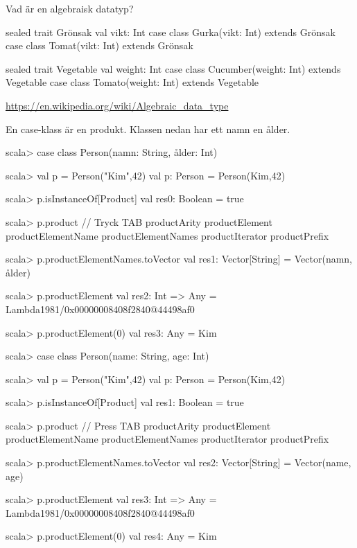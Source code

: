 \begin{Slide}{Vad är en algebraisk datatyp?}
\begin{itemize}
\begin{itemize}
\ifswedish
\begin{Code}
sealed trait Grönsak { val vikt: Int }
case class Gurka(vikt: Int) extends Grönsak
case class Tomat(vikt: Int) extends Grönsak
\end{Code}
\else
\begin{Code}
sealed trait Vegetable { val weight: Int }
case class Cucumber(weight: Int) extends Vegetable
case class Tomato(weight: Int) extends Vegetable
\end{Code}
\fi{}
\end{itemize}  
\end{itemize} 
{\vspace{0.5em}\SlideFontTiny \url{https://en.wikipedia.org/wiki/Algebraic_data_type}}
\end{Slide}

\begin{Slide}{En case-klass är en produkt.}
Klassen  nedan har ett namn  en ålder.
\ifswedish
\begin{REPL}
scala> case class Person(namn: String, ålder: Int)

scala> val p = Person("Kim",42)
val p: Person = Person(Kim,42)

scala> p.isInstanceOf[Product]
val res0: Boolean = true

scala> p.product   // Tryck TAB
productArity          productElement    productElementName
productElementNames   productIterator   productPrefix
          
scala> p.productElementNames.toVector
val res1: Vector[String] = Vector(namn, ålder)

scala> p.productElement
val res2: Int => Any = Lambda1981/0x00000008408f2840@44498af0

scala> p.productElement(0)
val res3: Any = Kim

\end{REPL}
\else
\begin{REPL}
scala> case class Person(name: String, age: Int)

scala> val p = Person("Kim",42)
val p: Person = Person(Kim,42)

scala> p.isInstanceOf[Product]
val res1: Boolean = true

scala> p.product   // Press TAB
productArity          productElement    productElementName
productElementNames   productIterator   productPrefix
          
scala> p.productElementNames.toVector
val res2: Vector[String] = Vector(name, age)

scala> p.productElement
val res3: Int => Any = Lambda1981/0x00000008408f2840@44498af0

scala> p.productElement(0)
val res4: Any = Kim

\end{REPL}
\fi{} 
\end{Slide}


